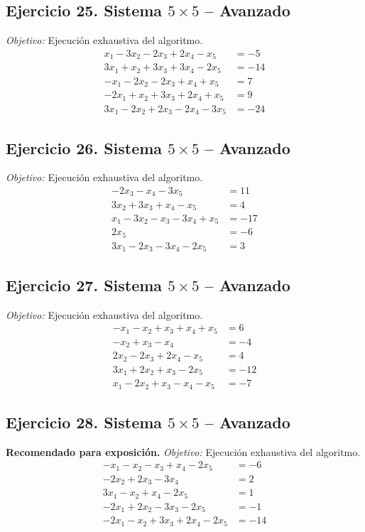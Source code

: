 \documentclass[12pt]{article}
\theoremstyle{remark}
\begin{document}
\subsection*{Ejercicio 25. Sistema $5\times5$ -- Avanzado}
\emph{Objetivo:} Ejecución exhaustiva del algoritmo.
\[
\begin{aligned}
x_{1} - 3 x_{2} - 2 x_{3} + 2 x_{4} - x_{5} &= -5\\
3 x_{1} + x_{2} + 3 x_{3} + 3 x_{4} - 2 x_{5} &= -14\\
- x_{1} - 2 x_{2} - 2 x_{3} + x_{4} + x_{5} &= 7\\
- 2 x_{1} + x_{2} + 3 x_{3} + 2 x_{4} + x_{5} &= 9\\
3 x_{1} - 2 x_{2} + 2 x_{3} - 2 x_{4} - 3 x_{5} &= -24
\end{aligned}
\]
\subsection*{Ejercicio 26. Sistema $5\times5$ -- Avanzado}
\emph{Objetivo:} Ejecución exhaustiva del algoritmo.
\[
\begin{aligned}
- 2 x_{3} - x_{4} - 3 x_{5} &= 11\\
3 x_{2} + 3 x_{3} + x_{4} - x_{5} &= 4\\
x_{1} - 3 x_{2} - x_{3} - 3 x_{4} + x_{5} &= -17\\
2 x_{5} &= -6\\
3 x_{1} - 2 x_{3} - 3 x_{4} - 2 x_{5} &= 3
\end{aligned}
\]
\subsection*{Ejercicio 27. Sistema $5\times5$ -- Avanzado}
\emph{Objetivo:} Ejecución exhaustiva del algoritmo.
\[
\begin{aligned}
- x_{1} - x_{2} + x_{3} + x_{4} + x_{5} &= 6\\
- x_{2} + x_{3} - x_{4} &= -4\\
2 x_{2} - 2 x_{3} + 2 x_{4} - x_{5} &= 4\\
3 x_{1} + 2 x_{2} + x_{3} - 2 x_{5} &= -12\\
x_{1} - 2 x_{2} + x_{3} - x_{4} - x_{5} &= -7
\end{aligned}
\]
\subsection*{Ejercicio 28. Sistema $5\times5$ -- Avanzado}
\textbf{Recomendado para exposición.} \emph{Objetivo:} Ejecución exhaustiva del algoritmo.
\[
\begin{aligned}
- x_{1} - x_{2} - x_{3} + x_{4} - 2 x_{5} &= -6\\
- 2 x_{2} + 2 x_{3} - 3 x_{4} &= 2\\
3 x_{1} - x_{2} + x_{4} - 2 x_{5} &= 1\\
- 2 x_{1} + 2 x_{2} - 3 x_{3} - 2 x_{5} &= -1\\
- 2 x_{1} - x_{2} + 3 x_{3} + 2 x_{4} - 2 x_{5} &= -14
\end{aligned}
\]
\end{document}
